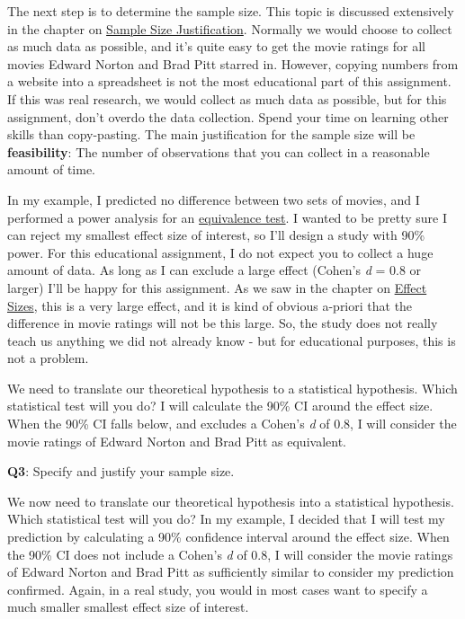 \documentclass[
  oneside]{book}
\begin{document}
The next step is to determine the sample size. This topic is discussed extensively in the chapter on \protect\hyperlink{power}{Sample Size Justification}. Normally we would choose to collect as much data as possible, and it's quite easy to get the movie ratings for all movies Edward Norton and Brad Pitt starred in. However, copying numbers from a website into a spreadsheet is not the most educational part of this assignment. If this was real research, we would collect as much data as possible, but for this assignment, don't overdo the data collection. Spend your time on learning other skills than copy-pasting. The main justification for the sample size will be \textbf{feasibility}: The number of observations that you can collect in a reasonable amount of time.

In my example, I predicted no difference between two sets of movies, and I performed a power
analysis for an \protect\hyperlink{equivalencetest}{equivalence test}. I wanted to be pretty sure I can reject my smallest effect size of interest, so I'll design a study with 90\% power. For this educational assignment, I do not expect you to collect a huge amount of data. As long as I can exclude a large effect (Cohen's \emph{d} = 0.8 or larger) I'll be happy for this assignment. As we saw in the chapter on \protect\hyperlink{effectsize}{Effect Sizes}, this is a very large effect, and it is kind of obvious a-priori that the difference in movie ratings will not be this large. So, the study does not really teach us anything we did not already know - but for educational purposes, this is not a problem.

We need to translate our theoretical hypothesis to a statistical hypothesis.
Which statistical test will you do? I will calculate the 90\% CI around the
effect size. When the 90\% CI falls below, and excludes a Cohen's \emph{d} of 0.8, I
will consider the movie ratings of Edward Norton and Brad Pitt as equivalent.

\textbf{Q3}: Specify and justify your sample size.

We now need to translate our theoretical hypothesis into a statistical hypothesis. Which statistical test will you do? In my example, I decided that I will test my prediction by calculating a 90\% confidence interval around the effect size. When the 90\% CI does not include a Cohen's \emph{d} of 0.8, I will consider the movie ratings of Edward Norton and Brad Pitt as sufficiently similar to consider my prediction confirmed. Again, in a real study, you would in most cases want to specify a much smaller smallest effect size of interest.
\end{document}
